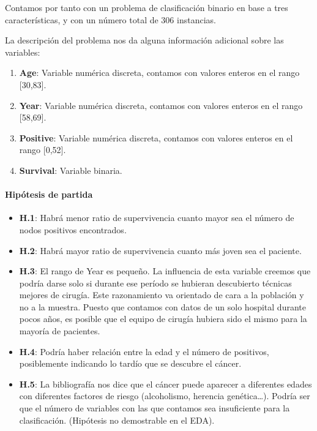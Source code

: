Contamos por tanto con un problema de clasificación binario en base a tres características, y con un número total de 306 instancias.

\vspace{\baselineskip}

La descripción del problema nos da alguna información adicional sobre las variables:

\begin{enumerate}
    \def\labelenumi{\arabic{enumi}.}
    \item \textbf{Age}: Variable numérica discreta, contamos con valores enteros en el
    rango {[}30,83{]}.
    \item \textbf{Year}: Variable numérica discreta, contamos con valores enteros en el
    rango {[}58,69{]}.
    \item \textbf{Positive}: Variable numérica discreta, contamos con valores enteros en
    el rango {[}0,52{]}.
    \item \textbf{Survival}: Variable binaria.
\end{enumerate}

\paragraph{Hipótesis de partida}

\begin{itemize}
    \item \textbf{H.1}: Habrá menor ratio de supervivencia cuanto mayor sea el número de nodos positivos encontrados.
    \item \textbf{H.2}: Habrá mayor ratio de supervivencia cuanto más joven sea el paciente.
    \item \textbf{H.3}: El rango de Year es pequeño. La influencia de esta variable creemos que podría darse solo si durante ese período se hubieran descubierto técnicas mejores de cirugía. Este razonamiento va orientado de cara a la población y no a la muestra. Puesto que contamos con datos de un solo hospital durante pocos años, es posible que el equipo de cirugía hubiera sido el mismo para la mayoría de pacientes.
    \item \textbf{H.4}: Podría haber relación entre la edad y el número de positivos, posiblemente indicando lo tardío que se descubre el cáncer.
    \item \textbf{H.5}: La bibliografía nos dice que el cáncer puede aparecer a diferentes edades con diferentes factores de riesgo (alcoholismo, herencia genética\ldots). Podría ser que el número de variables con las que contamos sea insuficiente para la clasificación. (Hipótesis no demostrable en el EDA).
\end{itemize}

